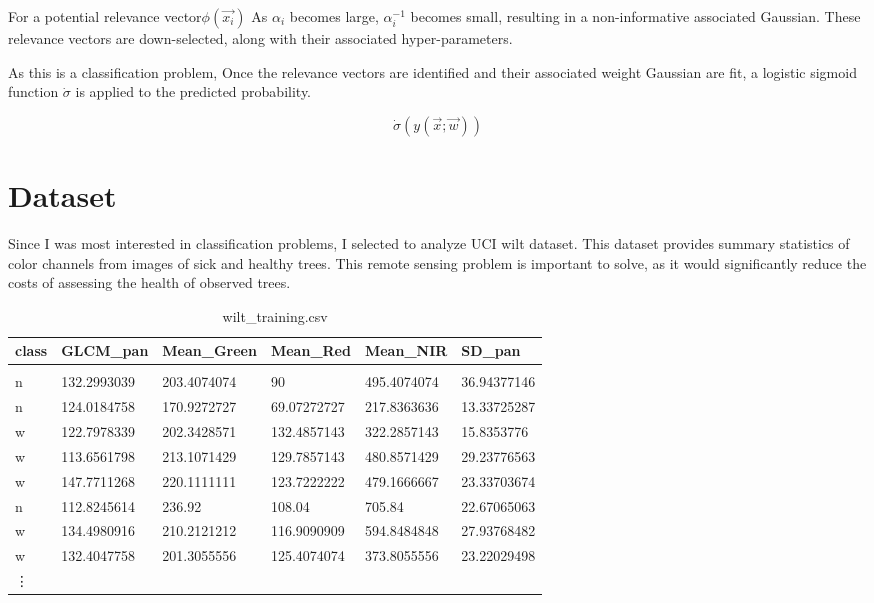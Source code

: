 \documentclass[11pt]{article} %
\def\rv{relevance vector\xspace}
\def\wilt{UCI wilt dataset\xspace}
\begin{document}
For a potential \rv $\phi(\vec{x_i})$ As $\alpha_i$ becomes large,
$\alpha_i^{-1}$ becomes small, resulting in a non-informative
associated Gaussian. These \rv{}s are down-selected, along
with their associated hyper-parameters.

As this is a classification problem, Once the \rv{}s are identified
and their associated weight Gaussian are fit, a logistic sigmoid
function $\dot{\sigma}$ is applied to the predicted probability.

\[\dot{\sigma}\left(y(\vec{x}; \vec{w})\right)\]

\section{Dataset}
Since I was most interested in classification problems, I
selected to analyze \wilt. This dataset provides summary
statistics of color channels from images of sick and healthy
trees. This remote sensing problem is important to solve, as
it would significantly reduce the costs of assessing the
health of observed trees.

\begin{table}[!h]
\centering
\caption{wilt\_training.csv}
\label{wilt_training.csv}
\begin{tabular}{llllll}
  {\bf class} & {\bf GLCM\_pan}   & {\bf Mean\_Green} & {\bf Mean\_Red}   & {\bf Mean\_NIR}   & {\bf SD\_pan} \\\hline\\
n     & 132.2993039 & 203.4074074 & 90          & 495.4074074 & 36.94377146 \\
n     & 124.0184758 & 170.9272727 & 69.07272727 & 217.8363636 & 13.33725287 \\
w     & 122.7978339 & 202.3428571 & 132.4857143 & 322.2857143 & 15.8353776  \\
w     & 113.6561798 & 213.1071429 & 129.7857143 & 480.8571429 & 29.23776563 \\
w     & 147.7711268 & 220.1111111 & 123.7222222 & 479.1666667 & 23.33703674 \\
n     & 112.8245614 & 236.92      & 108.04      & 705.84      & 22.67065063 \\
w     & 134.4980916 & 210.2121212 & 116.9090909 & 594.8484848 & 27.93768482 \\
w     & 132.4047758 & 201.3055556 & 125.4074074 & 373.8055556 & 23.22029498 \\
\vdots
\end{tabular}
\end{table}
\end{document}
